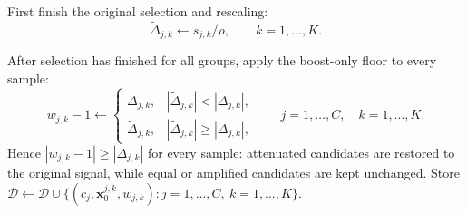 \documentclass{article} %
\begin{document}
\begin{algorithm}[H]
\begin{algorithmic}[1]
                \State First finish the original selection and rescaling:
                \[
                    \widetilde{\Delta}_{j,k}\leftarrow s_{j,k}/\rho,
                    \qquad k=1,\dots,K.
                \]
            \EndFor

            \State After selection has finished for all groups, apply the
            boost-only floor to every sample:
            \[
                w_{j,k}-1\leftarrow
                \begin{cases}
                    \Delta_{j,k},
                    &|\widetilde{\Delta}_{j,k}|<|\Delta_{j,k}|,\\
                    \widetilde{\Delta}_{j,k},
                    &|\widetilde{\Delta}_{j,k}|\ge|\Delta_{j,k}|,
                \end{cases}
                \qquad j=1,\dots,C,\quad k=1,\dots,K.
            \]
            \State Hence $|w_{j,k}-1|\ge|\Delta_{j,k}|$ for every sample:
            attenuated candidates are restored to the original signal, while
            equal or amplified candidates are kept unchanged.
            \State Store
            $\mathcal{D}\leftarrow\mathcal{D}\cup
            \{(c_j,\mathbf{x}_0^{j,k},w_{j,k}):
            j=1,\dots,C,\ k=1,\dots,K\}$.


\end{algorithmic}
\end{algorithm}
\end{document}
